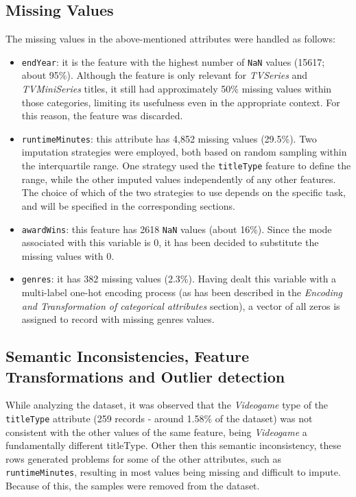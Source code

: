 \subsection{Missing Values}
The missing values in the above-mentioned attributes were handled as follows:
\begin{itemize}
    \item \texttt{endYear}: it is the feature with the highest number of \texttt{NaN} values (15617; about 95\%).
    Although the feature is only relevant for \textit{TVSeries} and \textit{TVMiniSeries} titles, it still
    had approximately 50\% missing values within those categories, limiting its usefulness even in the
    appropriate context. For this reason, the feature was discarded.
    
    \item \texttt{runtimeMinutes}: this attribute has 4,852 missing values (29.5\%). Two imputation strategies were employed, both based on random sampling within the interquartile range. 
    One strategy used the \texttt{titleType} feature to define the range, while the other imputed values independently of any other features. 
    The choice of which of the two strategies to use depends on the specific task, and will be specified in the corresponding sections.
    
    \item \texttt{awardWins}: this feature has 2618 \texttt{NaN} values (about 16\%).
    Since the mode associated with this variable is 0, it has been decided to substitute the missing
    values with 0.

    \item \texttt{genres}: it has 382 missing values (2.3\%). Having dealt this variable with a
    multi-label one-hot encoding process (as has been described in the \textit{Encoding and Transformation of categorical attributes}
    section), a vector of all zeros is assigned to record with missing genres values.
\end{itemize}



\subsection{Semantic Inconsistencies, Feature Transformations and Outlier detection}
While analyzing the dataset, it was observed that the \textit{Videogame} type of the \texttt{titleType} attribute (259 records - around 1.58\% of the dataset) 
was not consistent with the other values of the same feature, being \textit{Videogame} a fundamentally different titleType.
Other then this semantic inconsistency, these rows generated problems for some of the other attributes, such as \texttt{runtimeMinutes}, resulting in most values being missing and difficult to impute. 
Because of this, the samples were removed from the dataset. \\


